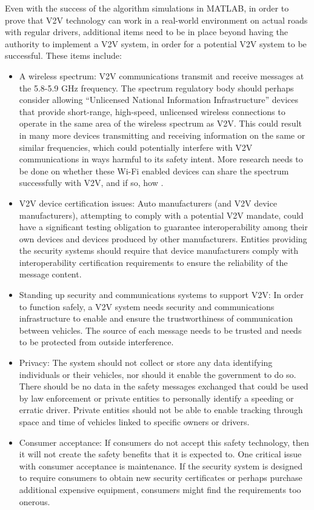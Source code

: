 \documentclass[12pt]{report}
\begin{document}
Even with the success of the algorithm simulations in MATLAB, in order to prove that V2V technology can work in a real-world environment on actual roads with regular drivers, additional items need to be in place beyond having the authority to implement a V2V system, in order for a potential V2V system to be successful. These items include:

\begin{itemize}
	\item A wireless spectrum: V2V communications transmit and receive messages at the 5.8-5.9 GHz frequency. The spectrum regulatory body should perhaps consider allowing “Unlicensed National Information Infrastructure” devices that provide short-range, high-speed, unlicensed wireless connections  to operate in the same area of the wireless spectrum as V2V. This could result in many more devices transmitting and receiving information on the same or similar frequencies, which could potentially interfere with V2V communications in ways harmful to its safety intent. More research needs to be done on whether these Wi-Fi enabled devices can share the spectrum successfully with V2V, and if so, how .
	
	\item V2V device certification issues: Auto manufacturers (and V2V device manufacturers), attempting to comply with a potential V2V mandate, could have a significant testing obligation to guarantee interoperability among their own devices and devices produced by other manufacturers. Entities providing the security systems should require that device manufacturers comply with interoperability certification requirements to ensure the reliability of the message content.
	
	\item Standing up security and communications systems to support V2V: In order to function safely, a V2V system needs security and communications infrastructure to enable and ensure the trustworthiness of communication between vehicles. The source of each message needs to be trusted and needs to be protected from outside interference.
	
	\item Privacy: The system should not collect or store any data identifying individuals or their vehicles, nor should it enable the government to do so. There should be no data in the safety messages exchanged that could be used by law enforcement or private entities to personally identify a speeding or erratic driver. Private entities should not be able to enable tracking through space and time of vehicles linked to specific owners or drivers.
	
	\item Consumer acceptance: If consumers do not accept this safety technology, then it will not create the safety benefits that it is expected to. One critical issue with consumer acceptance is maintenance. If the security system is designed to require consumers to obtain new security certificates or perhaps purchase additional expensive equipment, consumers might find the requirements too onerous.
\end{itemize}
\end{document}
